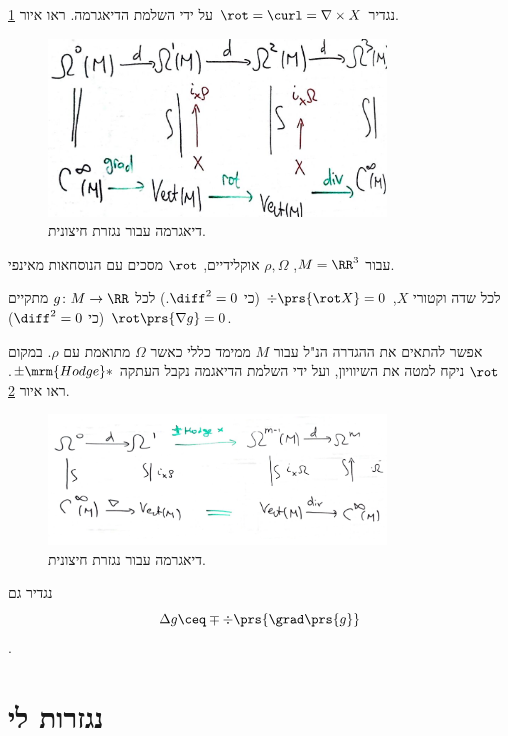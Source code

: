 \documentclass[a4paper,10pt,twoside,openany]{book}
\begin{document}
\begin{example}
נגדיר
$\rot = \curl = \nabla \times X$
על ידי השלמת הדיאגרמה.
ראו איור
\ref{rot3}.
\begin{figure}[h!t]
\centering
\caption{דיאגרמה עבור נגזרת חיצונית.}
\label{rot3}
\includegraphics[width=0.8\textwidth]{sources/rot3}
\end{figure}
\end{example}

\begin{exercise}
עבור
$M = \RR^3$,
$\rho, \Omega$
אוקלידיים,
$\rot$
מסכים עם הנוסחאות מאינפי.
\end{exercise}
\begin{corollary}
לכל שדה וקטורי
$X$,
$\div \prs{\rot X} = 0$
(כי
$\diff^2 = 0$.)
לכל
$g \colon M \to \RR$
מתקיים
$\rot\prs{\nabla g} = 0$
(כי
$\diff^2 = 0$).
\end{corollary}
\begin{remark}
אפשר להתאים את ההגדרה הנ"ל עבור
$M$
ממימד כללי כאשר
$\Omega$
מתואמת עם
$\rho$.
במקום
$\rot$
ניקח למטה את השיוויון, ועל ידי השלמת הדיאגמה נקבל העתקה
$\pm \mrm{Hodge } *$.
ראו איור
\ref{hodge_star}.
\begin{figure}[h!t]
\centering
\caption{דיאגרמה עבור נגזרת חיצונית.}
\label{hodge_star}
\includegraphics[width=0.8\textwidth]{sources/hodge_star}
\end{figure}
נגדיר גם
\[\Delta g \ceq \mp \div\prs{\grad\prs{g}}\]
.
\end{remark}

\chapter{נגזרות לי}
\end{document}
